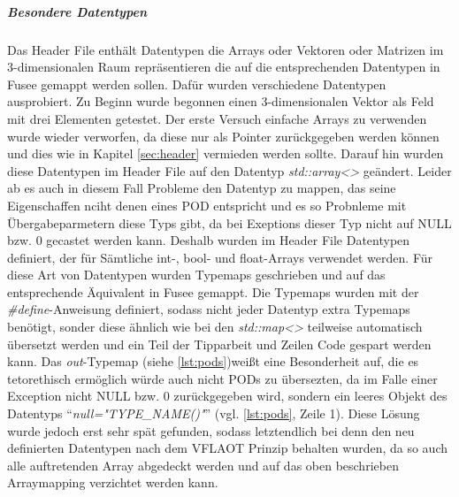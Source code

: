 \begin{code}[caption={inoreregex},label={lst:ignore}, escapechar=|]
\end{code}

\subparagraph{Besondere Datentypen}
Das Header File enthält Datentypen die Arrays oder Vektoren oder Matrizen im 3-dimensionalen Raum repräsentieren die auf die entsprechenden Datentypen in Fusee gemappt werden sollen. Dafür wurden verschiedene Datentypen ausprobiert. Zu Beginn wurde begonnen einen 3-dimensionalen Vektor als Feld mit drei Elementen getestet. 
Der erste Versuch einfache Arrays zu verwenden wurde wieder verworfen, da diese nur als Pointer zurückgegeben werden können und dies wie in Kapitel \ref{sec:header} vermieden werden sollte. Darauf hin wurden diese Datentypen im Header File auf den Datentyp \emph{std::array<>} geändert. Leider ab es auch in diesem Fall Probleme den Datentyp zu mappen, das seine Eigenschaffen nciht denen eines POD entspricht und es so Probnleme mit Übergabeparmetern diese Typs gibt, da bei Exeptions dieser Typ nicht auf NULL bzw. 0 gecastet werden kann.
Deshalb wurden im Header File Datentypen definiert, der für Sämtliche int-, bool- und float-Arrays verwendet werden. Für diese Art von Datentypen wurden Typemaps geschrieben und auf  das entsprechende Äquivalent in Fusee gemappt. Die Typemaps wurden mit der \emph{\#define}-Anweisung definiert, sodass nicht jeder Datentyp  extra Typemaps benötigt, sonder diese ähnlich wie bei den \emph{std::map<>} teilweise automatisch übersetzt werden und ein Teil der Tipparbeit und Zeilen Code gespart werden kann.
Das \emph{out}-Typemap (siehe \ref{lst:pods})weißt eine Besonderheit auf, die es tetorethisch ermöglich würde auch nicht PODs zu übersezten, da im Falle einer Exception nicht NULL bzw. 0 zurückgegeben wird, sondern ein leeres Objekt des Datentyps \enquote{\emph{null="TYPE\_NAME()"}} (vgl. \ref{lst:pods}, Zeile 1). Diese Lösung wurde jedoch erst sehr spät gefunden, sodass letztendlich bei denn den neu definierten Datentypen nach dem VFLAOT Prinzip behalten wurden, da so auch alle auftretenden Array abgedeckt werden und auf das oben beschrieben Arraymapping verzichtet werden kann. 
